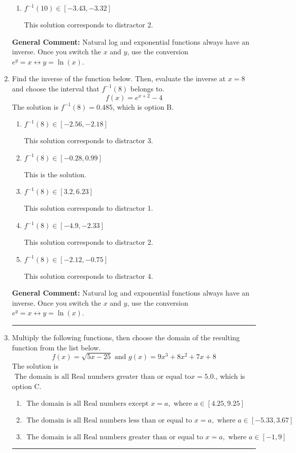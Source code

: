 \documentclass{extbook}[14pt]
\newcommand{\litem}[1]{\item #1

\rule{\textwidth}{0.4pt}}
\begin{document}
\begin{enumerate}
{\begin{enumerate}[label=\Alph*.]
 This is the solution.
\item \( f^{-1}(10) \in [-3.43, -3.32] \)

 This solution corresponds to distractor 2.
\end{enumerate}

\textbf{General Comment:} Natural log and exponential functions always have an inverse. Once you switch the $x$ and $y$, use the conversion $ e^y = x \leftrightarrow y=\ln(x)$.
}
\litem{
Find the inverse of the function below. Then, evaluate the inverse at $x = 8$ and choose the interval that $f^{-1}(8)$ belongs to.
\[ f(x) = e^{x+2}-4 \]The solution is \( f^{-1}(8) = 0.485 \), which is option B.\begin{enumerate}[label=\Alph*.]
\item \( f^{-1}(8) \in [-2.56, -2.18] \)

 This solution corresponds to distractor 3.
\item \( f^{-1}(8) \in [-0.28, 0.99] \)

 This is the solution.
\item \( f^{-1}(8) \in [3.2, 6.23] \)

 This solution corresponds to distractor 1.
\item \( f^{-1}(8) \in [-4.9, -2.33] \)

 This solution corresponds to distractor 2.
\item \( f^{-1}(8) \in [-2.12, -0.75] \)

 This solution corresponds to distractor 4.
\end{enumerate}

\textbf{General Comment:} Natural log and exponential functions always have an inverse. Once you switch the $x$ and $y$, use the conversion $ e^y = x \leftrightarrow y=\ln(x)$.
}
\litem{
Multiply the following functions, then choose the domain of the resulting function from the list below.
\[ f(x) = \sqrt{5x-25}  \text{ and } g(x) = 9x^{3} +8 x^{2} +7 x + 8 \]The solution is \( \text{ The domain is all Real numbers greater than or equal to} x = 5.0. \), which is option C.\begin{enumerate}[label=\Alph*.]
\item \( \text{ The domain is all Real numbers except } x = a, \text{ where } a \in [4.25, 9.25] \)


\item \( \text{ The domain is all Real numbers less than or equal to } x = a, \text{ where } a \in [-5.33, 3.67] \)


\item \( \text{ The domain is all Real numbers greater than or equal to } x = a, \text{ where } a \in [-1, 9] \)



\end{enumerate}}
\end{enumerate}
\end{document}
